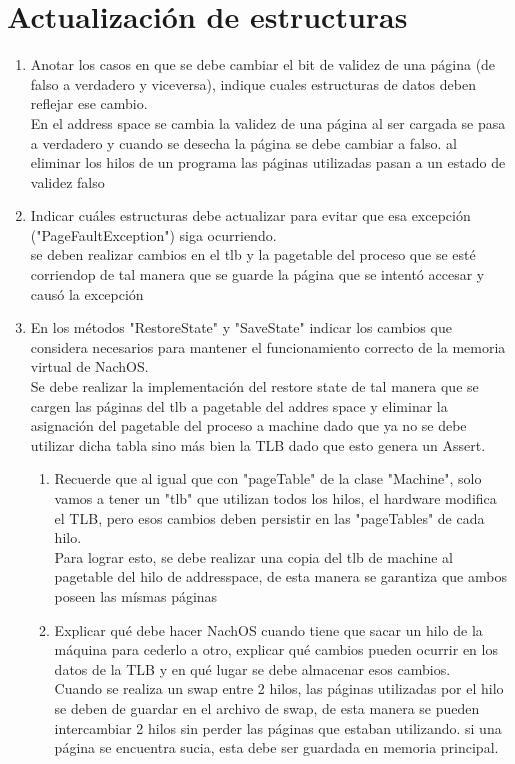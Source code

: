 \documentclass[11pt]{article}
\begin{document}
  \section{ Actualización de estructuras}
    \begin{enumerate}
      \item Anotar los casos en que se debe cambiar el bit de validez de una página (de falso a verdadero y viceversa), indique cuales estructuras de datos deben reflejar ese cambio.\\
      En el address space se cambia la validez de una página al ser cargada se pasa a verdadero y cuando se desecha la página se debe cambiar a falso. al eliminar los hilos de un programa las páginas utilizadas pasan a un estado de validez falso
      \item Indicar cuáles estructuras debe actualizar para evitar que esa excepción ("PageFaultException") siga ocurriendo.\\
      se deben realizar cambios en el tlb y la pagetable del proceso que se esté corriendop de tal manera que se guarde la página que se intentó accesar y causó la excepción
      \item En los métodos "RestoreState" y "SaveState" indicar los cambios que considera necesarios para mantener el funcionamiento correcto de la memoria virtual de NachOS.\\
      Se debe realizar la implementación del restore state de tal manera que se cargen las páginas del tlb a pagetable del addres space y eliminar la asignación del pagetable del proceso a machine dado que ya no se debe utilizar dicha tabla sino más bien la TLB dado que esto genera un Assert.
      \begin{enumerate}
        \item Recuerde que al igual que con "pageTable" de la clase "Machine", solo vamos a tener un "tlb" que utilizan todos los hilos, el hardware modifica el TLB, pero esos cambios deben persistir en las "pageTables" de cada hilo.\\
        Para lograr esto, se debe realizar una copia del tlb de machine al pagetable del hilo de addresspace, de esta manera se garantiza que ambos poseen las mísmas páginas
        \item Explicar qué debe hacer NachOS cuando tiene que sacar un hilo de la máquina para cederlo a otro, explicar qué cambios pueden ocurrir en los datos de la TLB y en qué lugar se debe almacenar esos cambios.\\
        Cuando se realiza un swap entre 2 hilos, las páginas utilizadas por el hilo se deben de guardar en el archivo de swap, de esta manera se pueden intercambiar 2 hilos sin perder las páginas que estaban utilizando. si una página se encuentra sucia, esta debe ser guardada en memoria principal.

\end{enumerate}
\end{enumerate}
\end{document}
